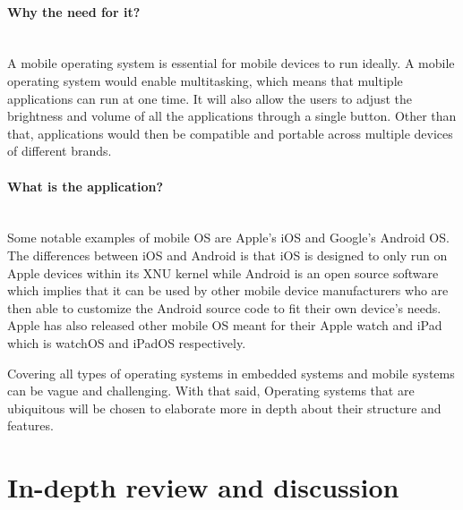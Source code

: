 \documentclass[conference]{IEEEtran}
\newcommand{\forceindent}{\leavevmode{\parindent=1em\indent}}
\begin{document}
\paragraph{Why the need for it?}\mbox{} \\
\forceindent A mobile operating system is essential for mobile devices to run ideally. A mobile operating system would enable multitasking, which means that multiple applications can run at one time. It will also allow the users to adjust the brightness and volume of all the applications through a single button. Other than that, applications would then be compatible and portable across multiple devices of different brands.
\\
\paragraph{What is the application?}\mbox{} \\
\forceindent Some notable examples of mobile OS are Apple’s iOS and Google’s Android OS. The differences between iOS and Android is that iOS is designed to only run on Apple devices within its XNU kernel while Android is an open source software which implies that it can be used by other mobile device manufacturers who are then able to customize the Android source code to fit their own device’s needs. Apple has also released other mobile OS meant for their Apple watch and iPad which is watchOS and iPadOS respectively\cite{CSMOS}.


\smallskip
\forceindent Covering all types of operating systems in embedded systems and mobile systems can be vague and challenging. With that said, Operating  systems  that are ubiquitous will be chosen to elaborate more in depth about their structure and features.



\section{In-depth review and discussion}


\end{document}
